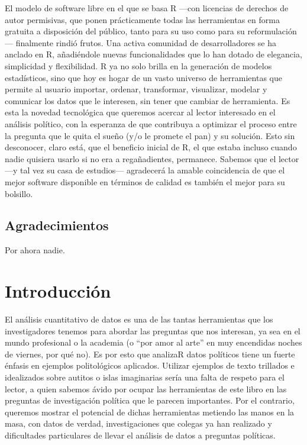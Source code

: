 \documentclass[]{book}
\begin{document}
El modelo de software libre en el que se basa R ---con licencias de
derechos de autor permisivas, que ponen prácticamente todas las
herramientas en forma gratuita a disposición del público, tanto para su
uso como para su reformulación--- finalmente rindió frutos. Una activa
comunidad de desarrolladores se ha anclado en R, añadiéndole nuevas
funcionalidades que lo han dotado de elegancia, simplicidad y
flexibilidad. R ya no solo brilla en la generación de modelos
estadísticos, sino que hoy es hogar de un vasto universo de herramientas
que permite al usuario importar, ordenar, transformar, visualizar,
modelar y comunicar los datos que le interesen, sin tener que cambiar de
herramienta. Es esta la novedad tecnológica que queremos acercar al
lector interesado en el análisis político, con la esperanza de que
contribuya a optimizar el proceso entre la pregunta que le quita el
sueño (y/o le promete el pan) y su solución. Esto sin desconocer, claro
está, que el beneficio inicial de R, el que estaba incluso cuando nadie
quisiera usarlo si no era a regañadientes, permanece. Sabemos que el
lector ---y tal vez su casa de estudios--- agradecerá la amable
coincidencia de que el mejor software disponible en términos de calidad
es también el mejor para su bolsillo.

\section{Agradecimientos}\label{agradecimientos}

Por ahora nadie.

\chapter{Introducción}\label{introduccion}

El análisis cuantitativo de datos es una de las tantas herramientas que
los investigadores tenemos para abordar las preguntas que nos interesan,
ya sea en el mundo profesional o la academia (o ``por amor al arte'' en
muy encendidas noches de viernes, por qué no). Es por esto que analizaR
datos políticos tiene un fuerte énfasis en ejemplos politológicos
aplicados. Utilizar ejemplos de texto trillados e idealizados sobre
autitos o islas imaginarias sería una falta de respeto para el lector, a
quien sabemos ávido por ocupar las herramientas de este libro en las
preguntas de investigación política que le parecen importantes. Por el
contrario, queremos mostrar el potencial de dichas herramientas metiendo
las manos en la masa, con datos de verdad, investigaciones que colegas
ya han realizado y dificultades particulares de llevar el análisis de
datos a preguntas políticas.
\end{document}
